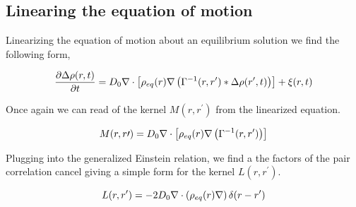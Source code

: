 \subsection{Linearing the equation of motion}

Linearizing the equation of motion about an equilibrium solution we find the following form,

\begin{equation}
	\frac{\partial \Delta \rho (r, t)}{\partial t} = D_0\nabla \cdot \left[\rho_{eq}(r)\nabla \left(\Gamma^{-1}(r, r^\prime)\ast \Delta\rho(r^\prime, t)\right)\right] + \xi(r, t)
\end{equation}

Once again we can read of the kernel $M(r, r^\prime)$ from the linearized equation.

\begin{equation}
	M(r, r\prime) = D_0\nabla \cdot \left[\rho_{eq}(r)\nabla \left(\Gamma^{-1}(r, r^\prime)\right)\right]
\end{equation}

Plugging into the generalized Einstein relation, we find a the factors of the pair correlation cancel giving a simple form for the kernel $L(r, r^\prime)$.

\begin{equation}
	L(r, r^\prime) = -2D_0\nabla\cdot\left(\rho_{eq}(r)\nabla\right)\delta(r - r^\prime)
\end{equation}
